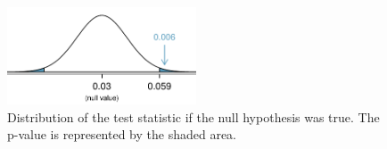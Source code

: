\begin{figure}
\centering
\includegraphics[width=0.5\textwidth]{ch_inference_for_props/figures/bladesTwoSampleHTPValueQC/bladesTwoSampleHTPValueQC}
\caption{Distribution of the test statistic if the null hypothesis was true. The p-value is represented by the shaded area.}
\label{bladesTwoSampleHTPValueQC}
\end{figure}



%
%
%
%



